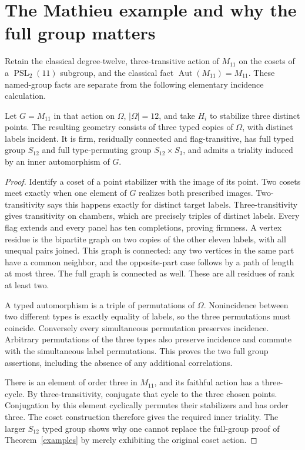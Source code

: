 \documentclass[11pt,a4paper]{article}
\begin{document}
\section{The Mathieu example and why the full group matters}
Retain the classical degree-twelve, three-transitive action of $M_{11}$
on the cosets of a $\operatorname{PSL}_2(11)$ subgroup, and the classical
fact $\operatorname{Aut}(M_{11})=M_{11}$. These named-group facts are separate
from the following elementary incidence calculation.

\begin{proposition}\label{mathieu}
Let $G=M_{11}$ in that action on $\Omega$, $|\Omega|=12$, and take
$H_i$ to stabilize three distinct points. The resulting geometry consists
of three typed copies of $\Omega$, with distinct labels incident. It is
firm, residually connected and flag-transitive, has full typed group
$S_{12}$ and full type-permuting group $S_{12}\times S_3$, and admits a
triality induced by an inner automorphism of $G$.
\end{proposition}
\begin{proof}
Identify a coset of a point stabilizer with the image of its point.
Two cosets meet exactly when one element of $G$ realizes both prescribed
images. Two-transitivity says this happens exactly for distinct target
labels. Three-transitivity gives transitivity on chambers, which are
precisely triples of distinct labels. Every flag extends and every panel
has ten completions, proving firmness.
A vertex residue is the bipartite graph on two copies of the other eleven
labels, with all unequal pairs joined. This graph is connected: any two
vertices in the same part have a common neighbor, and the opposite-part
case follows by a path of length at most three. The full graph is connected
as well. These are all residues of rank at least two.

A typed automorphism is a triple of permutations of $\Omega$. Nonincidence
between two different types is exactly equality of labels, so the three
permutations must coincide. Conversely every simultaneous permutation
preserves incidence. Arbitrary permutations of the three types also
preserve incidence and commute with the simultaneous label permutations.
This proves the two full group assertions, including the absence of any
additional correlations.

There is an element of order three in $M_{11}$, and its faithful action has
a three-cycle. By three-transitivity, conjugate that cycle to the three
chosen points. Conjugation by this element cyclically permutes their
stabilizers and has order three. The coset construction therefore gives
the required inner triality. The larger $S_{12}$ typed group shows why
one cannot replace the full-group proof of Theorem~\ref{examples} by merely
exhibiting the original coset action.
\end{proof}
\end{document}

